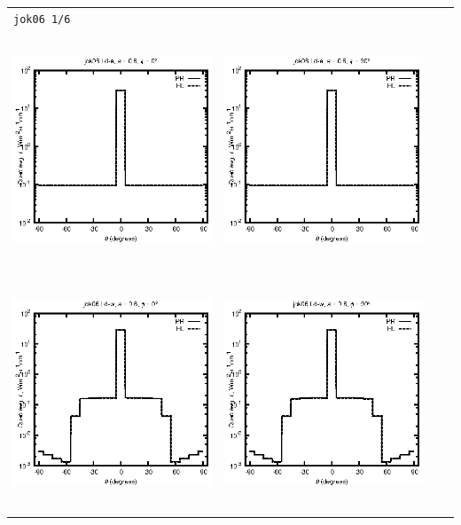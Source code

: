 \begin{tabular}{c c c c}
\multicolumn{4}{l}{\texttt{jok06 1/6}} \\
\includegraphics[height=7cm]{../eps/jok06_Ld_a_fwd.eps} &
\includegraphics[height=7cm]{../eps/jok06_Ld_a_cross.eps}\\
\includegraphics[height=7cm]{../eps/jok06_Ld_w_fwd.eps} &
\includegraphics[height=7cm]{../eps/jok06_Ld_w_cross.eps} \\

\end{tabular}
